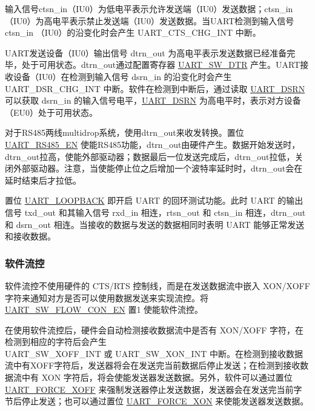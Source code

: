 \documentclass[main\_\_CN.tex]{subfiles}
\begin{document}
输入信号ctsn\_in（IU0）为低电平表示允许发送端（IU0）发送数据；ctsn\_in（IU0）为高电平表示禁止发送端（IU0）发送数据。当UART检测到输入信号 ctsn\_in （IU0）的沿变化时会产生 UART\_CTS\_CHG\_INT 中断。

UART发送设备（IU0）输出信号 dtrn\_out 为高电平表示发送数据已经准备完毕，处于可用状态。dtrn\_out通过配置寄存器  \hyperref[fielddesc:UARTSWDTR]{UART\_SW\_DTR} 产生。UART接收设备（IU0）在检测到输入信号 dsrn\_in 的沿变化时会产生 UART\_DSR\_CHG\_INT 中断。软件在检测到中断后，通过读取  \hyperref[fielddesc:UARTDSRN]{UART\_DSRN} 可以获取 dsrn\_in 的输入信号电平，\hyperref[fielddesc:UARTDSRN]{UART\_DSRN} 为高电平时，表示对方设备（EU0）处于可用状态。

对于RS485两线multidrop系统，使用dtrn\_out来收发转换。置位 \hyperref[fielddesc:UARTRS485EN]{UART\_RS485\_EN} 使能RS485功能，dtrn\_out由硬件产生。数据开始发送时，dtrn\_out拉高，使能外部驱动器；数据最后一位发送完成后，dtrn\_out拉低，关闭外部驱动器。注意，当使能停止位之后增加一个波特率延时时，dtrn\_out会在延时结束后才拉低。

置位 \hyperref[fielddesc:UARTLOOPBACK]{UART\_LOOPBACK} 即开启 UART 的回环测试功能。此时 UART 的输出信号 txd\_out 和其输入信号 rxd\_in 相连，rtsn\_out 和 ctsn\_in 相连，dtrn\_out 和 dsrn\_out 相连。当接收的数据与发送的数据相同时表明 UART 能够正常发送和接收数据。

\subsubsection{软件流控}

软件流控不使用硬件的 CTS/RTS 控制线，而是在发送数据流中嵌入 XON/XOFF 字符来通知对方是否可以使用数据发送来实现流控。将 \hyperref[fielddesc:UARTSWFLOWCONEN]{UART\_SW\_FLOW\_CON\_EN} 置1 使能软件流控。

在使用软件流控后，硬件会自动检测接收数据流中是否有 XON/XOFF 字符，在检测到相应的字符后会产生\\ UART\_SW\_XOFF\_INT 或 UART\_SW\_XON\_INT 中断。在检测到接收数据流中有XOFF字符后，发送器将会在发送完当前数据后停止发送；在检测到接收数据流中有 XON 字符后，将会使能发送器发送数据。另外，软件可以通过置位 \hyperref[fielddesc:UARTFORCEXOFF]{UART\_FORCE\_XOFF} 来强制发送器停止发送数据，发送器会在发送完当前字节后停止发送；也可以通过置位 \hyperref[fielddesc:UARTFORCEXON]{UART\_FORCE\_XON} 来使能发送器发送数据。
\end{document}
